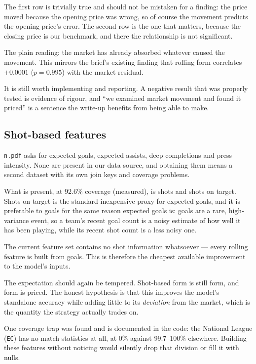 \documentclass[11pt,a4paper]{article}
\newcommand{\code}[1]{\texttt{#1}}
\begin{document}
The first row is trivially true and should not be mistaken for a finding: the
price moved because the opening price was wrong, so of course the movement
predicts the opening price's error. The second row is the one that matters,
because the closing price is our benchmark, and there the relationship is not
significant.

The plain reading: the market has already absorbed whatever caused the
movement. This mirrors the brief's existing finding that rolling form
correlates $+0.0001$ ($p=0.995$) with the market residual.

It is still worth implementing and reporting. A negative result that was
properly tested is evidence of rigour, and ``we examined market movement and
found it priced'' is a sentence the write-up benefits from being able to make.

\subsection{Shot-based features}

\code{n.pdf} asks for expected goals, expected assists, deep completions and
press intensity. None are present in our data source, and obtaining them means
a second dataset with its own join keys and coverage problems.

What is present, at 92.6\% coverage (measured), is shots and shots on target.
Shots on target is the standard inexpensive proxy for expected goals, and it
is preferable to goals for the same reason expected goals is: goals are a
rare, high-variance event, so a team's recent goal count is a noisy estimate
of how well it has been playing, while its recent shot count is a less noisy
one.

The current feature set contains no shot information whatsoever --- every
rolling feature is built from goals. This is therefore the cheapest available
improvement to the model's inputs.

The expectation should again be tempered. Shot-based form is still form, and
form is priced. The honest hypothesis is that this improves the model's
standalone accuracy while adding little to its \emph{deviation} from the
market, which is the quantity the strategy actually trades on.

One coverage trap was found and is documented in the code: the National League
(\code{EC}) has no match statistics at all, at 0\% against 99.7--100\%
elsewhere. Building these features without noticing would silently drop that
division or fill it with nulls.
\end{document}
